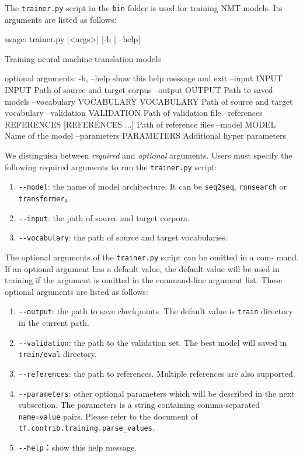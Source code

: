 \documentclass{article}
\begin{document}
The \verb|trainer.py| script in the \verb|bin| folder is used for training NMT models. Its arguments are listed as follows:
\begin{everbatim}
usage: trainer.py [<args>] [-h | --help]

Training neural machine translation models

optional arguments:
  -h, --help            show this help message and exit
  --input INPUT INPUT   Path of source and target corpus
  --output OUTPUT       Path to saved models
  --vocabulary VOCABULARY VOCABULARY
                        Path of source and target vocabulary
  --validation VALIDATION
                        Path of validation file
  --references REFERENCES [REFERENCES ...]
                        Path of reference files
  --model MODEL         Name of the model
  --parameters PARAMETERS
                        Additional hyper parameters
\end{everbatim}

We distinguish between \textit{required} and \textit{optional} arguments. Users must specify the following required arguments to run the \verb|trainer.py| script:
\begin{enumerate}
\item \verb|--model|: the name of model architecture. It can be \verb|seq2seq|, \verb|rnnsearch| or \verb|transformer|。
\item \verb|--input|: the path of source and target corpora.
\item \verb|--vocabulary|: the path of source and target vocabularies.
\end{enumerate}

The optional arguments of the \verb|trainer.py| script can be omitted in a com- mand. If an optional argument has a default value, the default value will be used in training if the argument is omitted in the command-line argument list. These optional arguments are listed as follows:
\begin{enumerate}
\item \verb|--output|: the path to save checkpoints. The default value is \verb|train| directory in the current path.
\item \verb|--validation|: the path to the validation set. The best model will saved in \verb|train/eval| directory.
\item \verb|--references|: the path to references. Multiple references are also supported.
\item \verb|--parameters|: other optional parameters which will be described in the next subsection. The parameters is a string containing comma-separated \verb|name=value| pairs. Please refer to the document of \verb|tf.contrib.training.parse_values|.
\item \verb|--help|：show this help message.
\end{enumerate}
\end{document}
